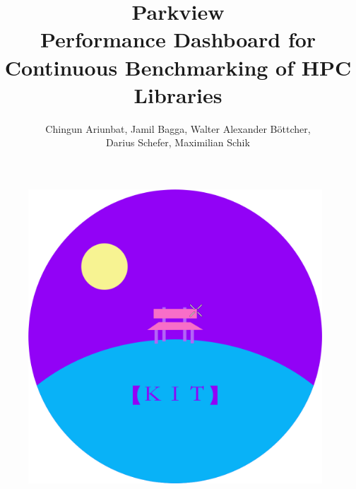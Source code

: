 \documentclass[parskip=full,11pt]{scrartcl}
\title{\Huge Parkview\\ 
    \LARGE \normalfont Performance Dashboard for Continuous Benchmarking of HPC Libraries}
\author{Chingun Ariunbat, Jamil Bagga, Walter Alexander B\"ottcher,\\Darius Schefer, Maximilian Schik}
\begin{document}
\maketitle
\begin{figure}[h]
	\includegraphics[width=11cm]{vapor.png}
	\centering	
\end{figure}

\clearpage

\tableofcontents
\clearpage


\clearpage


\clearpage


\clearpage


\clearpage


\clearpage


\clearpage


\clearpage


\clearpage


\clearpage

\appendix

\printnoidxglossaries
\end{document}
